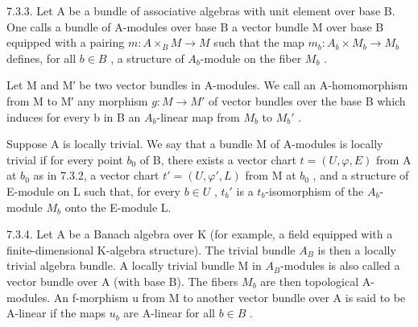 7.3.3. Let A be a bundle of associative algebras with unit element over base B. One calls a bundle of A-modules over base B a vector bundle M over base B equipped with a pairing \(m: A \times_{B} M \to M\) such that the map \(m_{b}: A_{b} \times M_{b} \to M_{b}\) defines, for all \(b \in B\) , a structure of \(A_{b}\)-module on the fiber \(M_{b}\) .

Let M and M′ be two vector bundles in A-modules. We call an A-homomorphism from M to M′ any morphism \(g: M \rightarrow M'\) of vector bundles over the base B which induces for every b in B an \(A_b\)-linear map from \(M_b\) to \(M_b'\) .

Suppose A is locally trivial. We say that a bundle M of A-modules is locally trivial if for every point \(b_0\) of B, there exists a vector chart \(t = (U, \varphi, E)\) from A at \(b_0\) as in 7.3.2, a vector chart \(t' = (U, \varphi', L)\) from M at \(b_0\) , and a structure of E-module on L such that, for every \(b \in U\) , \(t_b'\) is a \(t_b\)-isomorphism of the \(A_b\)-module \(M_b\) onto the E-module L.

7.3.4. Let A be a Banach algebra over K (for example, a field equipped with a finite-dimensional K-algebra structure). The trivial bundle \(A_{B}\) is then a locally trivial algebra bundle. A locally trivial bundle M in \(A_{B}\)-modules is also called a vector bundle over A (with base B). The fibers \(M_{b}\) are then topological A-modules. An f-morphism u from M to another vector bundle over A is said to be A-linear if the maps \(u_{b}\) are A-linear for all \(b \in B\) .


